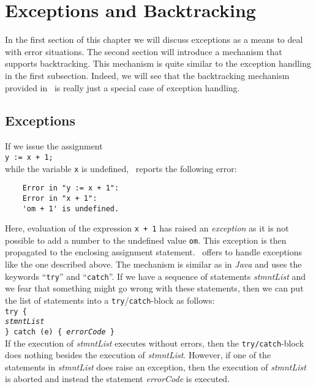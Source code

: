 \chapter{Exceptions and Backtracking}
In the first section of this chapter we will discuss exceptions as a means to deal with error
situations.  The second section will introduce  a mechanism that supports backtracking. 
This mechanism is quite similar to the exception handling in the first subsection.  Indeed, we
will see that the backtracking mechanism provided in \setlx\ is really just a special case of
exception handling.

\section{Exceptions}
If we issue the assignment
\\[0.2cm]
\hspace*{1.3cm}
\texttt{y := x + 1;}
\\[0.2cm]
while the variable \texttt{x} is undefined, \setlx\ reports the following error:
\begin{verbatim}
    Error in "y := x + 1":
    Error in "x + 1":
    'om + 1' is undefined.
\end{verbatim}
Here, evaluation of the expression \texttt{x + 1} has raised an \emph{exception} 
as it is not possible to add a number to the undefined value \texttt{om}.  This exception is then
propagated to the enclosing assignment statement. \setlx\ offers to handle exceptions like the
one described above.  The mechanism is similar as in \textsl{Java} and uses the keywords
``\texttt{try}'' and ``\texttt{catch}''.   If we have a sequence of statements
\textsl{stmntList} and we fear that 
something might go wrong with these statements, then we can put the list of statements into a
\texttt{try}/\texttt{catch}-block as follows:
\\[0.2cm]
\hspace*{1.3cm}
\texttt{try \{}
\\
\hspace*{1.8cm}
\texttt{\textsl{stmntList}}
\\
\hspace*{1.3cm}
\texttt{\} catch (e) \{ \textsl{errorCode} \}}
\\[0.2cm]
If the execution of \textsl{stmntList} executes without errors, then the
\texttt{try/catch}-block does nothing besides the execution of \textsl{stmntList}.  However, if
one of the statements in \textsl{stmntList} does raise an exception, then the execution of 
\textsl{stmntList} is aborted and instead the statement \textsl{errorCode} is executed.

